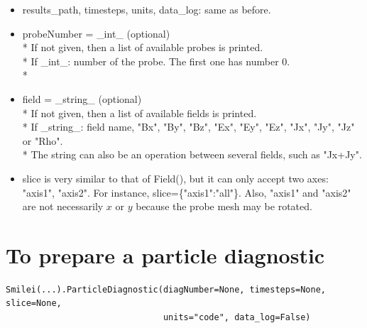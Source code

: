 \documentclass[11pt]{article}
\newcommand{\code}[1]{\colorbox{yellow!15}{\ttfamily #1}}
\begin{document}
\begin{itemize}
\item \code{results\_path}, \code{timesteps}, \code{units}, \code{data\_log}: same as before.
\item \code{probeNumber} = \code{\_int\_} (optional)\\*
	If not given, then a list of available probes is printed.\\*
	If \code{\_int\_}: number of the probe. The first one has number 0.\\*
\item \code{field} = \code{\_string\_} (optional)\\*
	If not given, then a list of available fields is printed.\\*
	If \code{\_string\_}: field name, \code{"Bx"}, \code{"By"}, \code{"Bz"}, \code{"Ex"}, \code{"Ey"}, \code{"Ez"}, \code{"Jx"}, \code{"Jy"}, \code{"Jz"} or \code{"Rho"}.\\*
	The string can also be an operation between several fields, such as \code{"Jx+Jy"}.
\item \code{slice} is very similar to that of \code{Field()}, but it can only accept two axes: \code{"axis1"}, \code{"axis2"}.
	For instance, \code{slice=\{"axis1":"all"\}}. Also, \code{"axis1"} and \code{"axis2"} are not necessarily $x$ or $y$ because the probe mesh may be rotated.
\end{itemize}
\vspace{0.5cm}


\section{To prepare a particle diagnostic}

\begin{lstlisting}
Smilei(...).ParticleDiagnostic(diagNumber=None, timesteps=None, slice=None,
                               units="code", data_log=False)
\end{lstlisting}
\end{document}
